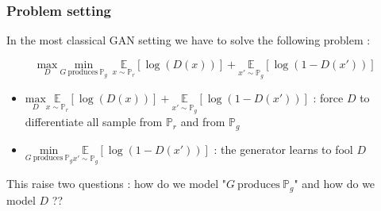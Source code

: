 \documentclass[french,9pt]{beamer}
\begin{document}

\begin{frame}
\frametitle{Problem setting}

In the most classical GAN setting we have to solve the following problem :

\begin{equation}
\label{ganoriginalproblem}
\underset{D}{\text{max}} \ \underset{G \ \text{produces} \  \mathbb{P}_{g}}{\text{min}} \  \ \underset{x \sim \mathbb{P}_{r}}{\mathbb{E}}[\log(D(x))]+ \underset{x' \sim \mathbb{P}_{g}}{\mathbb{E}}[\log(1-D(x'))]
\end{equation}

\begin{itemize}
\pause 
\item $\underset{D}{\text{max}} \underset{x \sim \mathbb{P}_{r}}{\mathbb{E}}[\log(D(x))]+ \underset{x' \sim \mathbb{P}_{g}}{\mathbb{E}}[\log(1-D(x'))]$ : force $D$ to differentiate all sample from $\mathbb{P}_{r}$ and from $ \mathbb{P}_{g}$
\pause
\item $\underset{G \ \text{produces} \  \mathbb{P}_{g}}{\text{min}}  \underset{x' \sim \mathbb{P}_{g}}{\mathbb{E}}[\log(1-D(x'))]$ :  the generator learns to fool $D$
\end{itemize}

\pause

This raise two questions : how do we model "$G \ \text{produces} \  \mathbb{P}_{g}$" and how do we model $D$ ??


\end{frame}
\end{document}
